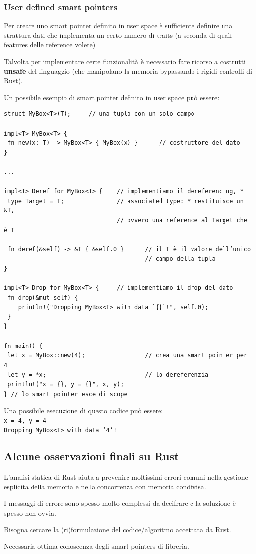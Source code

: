 \documentclass{article}
\begin{document}
\subsubsection*{User defined smart pointers}
Per creare uno smart pointer definito in user space è sufficiente definire una strattura dati che implementa un certo numero di traits (a seconda di quali features delle reference volete).

Talvolta per implementare certe funzionalità è necessario fare ricorso a costrutti \textbf{unsafe} del linguaggio (che manipolano la memoria bypassando i rigidi controlli di Rust).

\pagebreak

Un possibile esempio di smart pointer definito in user space può essere:
\begin{tcolorbox}
\begin{verbatim}
struct MyBox<T>(T);     // una tupla con un solo campo

impl<T> MyBox<T> {      
 fn new(x: T) -> MyBox<T> { MyBox(x) }      // costruttore del dato
}

...

impl<T> Deref for MyBox<T> {    // implementiamo il dereferencing, *
 type Target = T;               // associated type: * restituisce un &T,
                                // ovvero una reference al Target che è T

 fn deref(&self) -> &T { &self.0 }      // il T è il valore dell’unico 
                                        // campo della tupla
}

impl<T> Drop for MyBox<T> {     // implementiamo il drop del dato
 fn drop(&mut self) {
    println!("Dropping MyBox<T> with data `{}`!", self.0);
 }
}

fn main() {
 let x = MyBox::new(4);                 // crea una smart pointer per 4
 let y = *x;                            // lo dereferenzia
 println!("x = {}, y = {}", x, y);
} // lo smart pointer esce di scope
\end{verbatim}
\end{tcolorbox}
Una possibile esecuzione di questo codice può essere:\\
\texttt{x = 4, y = 4\\
Dropping MyBox<T> with data `4`!
}

\subsection*{Alcune osservazioni finali su Rust}
L’analisi statica di Rust aiuta a prevenire moltissimi errori comuni nella gestione esplicita della memoria e nella concorrenza con memoria condivisa.

I messaggi di errore sono spesso molto complessi da decifrare e la soluzione è spesso non ovvia.

Bisogna cercare la (ri)formulazione del codice/algoritmo accettata da Rust.

Necessaria ottima conoscenza degli smart pointers di libreria.
\end{document}
